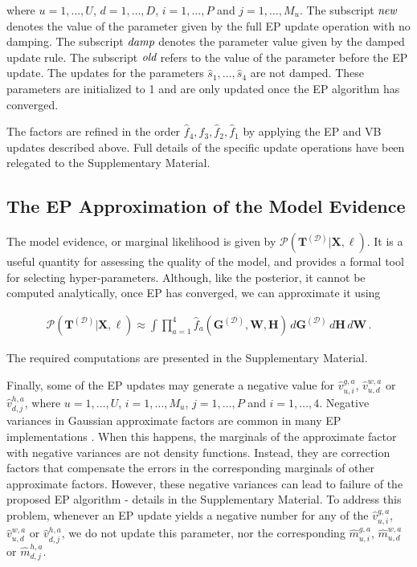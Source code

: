 where $u = 1,\ldots,U$, $d = 1,\ldots,D$, $i = 1,\ldots,P$ and $j=1,\ldots,M_u$.
The subscript $\emph{new}$ denotes the value of the parameter 
given by the full EP update operation with no damping.
The subscript $\emph{damp}$ denotes the parameter value given by the
damped update rule. The subscript $\emph{old}$ refers to
the value of the parameter before the EP update.
The updates for the parameters $\hat{s}_1,\ldots,\hat{s}_4$ are not damped. These parameters are initialized to 1 and are only
updated once the EP algorithm has converged.

The factors are refined in the order $\hat{f}_4, \hat{f}_3, \hat{f}_2, \hat{f}_1$ by applying the EP and VB updates described above. Full details of the specific update operations have been relegated to the Supplementary Material.


\subsection{The EP Approximation of the Model Evidence}

The model evidence, or marginal likelihood is given by $\mathcal{P}(\mathbf{T}^{(\mathcal{D})}|\mathbf{X},\ell)$. It is a useful quantity for assessing the quality of the model, and provides a formal tool for selecting hyper-parameters.
Although, like the posterior, it cannot be computed analytically, once EP has converged, we can approximate it using

\begin{align}
\mathcal{P}(\mathbf{T}^{(\mathcal{D})}|\mathbf{X},\ell) \approx \int \prod_{a=1}^4
\hat{f}_a(\mathbf{G}^{(\mathcal{D})},\mathbf{W},\mathbf{H})\,d\mathbf{G}^{(\mathcal{D})}\,d\mathbf{H}\,d\mathbf{W}\,.
\end{align}

The required computations are presented in the Supplementary Material.

Finally, some of the EP updates may generate a negative value for $\hat{v}_{u,i}^{g,a}$, 
$\hat{v}_{u,d}^{w,a}$ or $\hat{v}_{d,j}^{h,a}$, where $u = 1,\ldots,U$, $i = 1,\ldots,M_u$, $j = 1,\ldots,P$ and $i = 1,\ldots,4$.
Negative variances in Gaussian approximate factors 
are common in many EP implementations \citep{Minka2001,Minka2002}.
When this happens, the marginals of the approximate factor with negative 
variances are not density functions. Instead, they
are correction factors that compensate the errors in the corresponding marginals of other approximate factors.
However, these negative variances can lead to failure of the proposed EP algorithm
 - details in the Supplementary Material.
To address this problem, whenever an EP update yields a negative number for any of the
$\hat{v}_{u,i}^{g,a}$, $\hat{v}_{u,d}^{w,a}$ or $\hat{v}_{d,j}^{h,a}$, we do not update this parameter, nor the corresponding
$\hat{m}_{u,i}^{g,a}$, $\hat{m}_{u,d}^{w,a}$ or $\hat{m}_{d,j}^{h,a}$.

